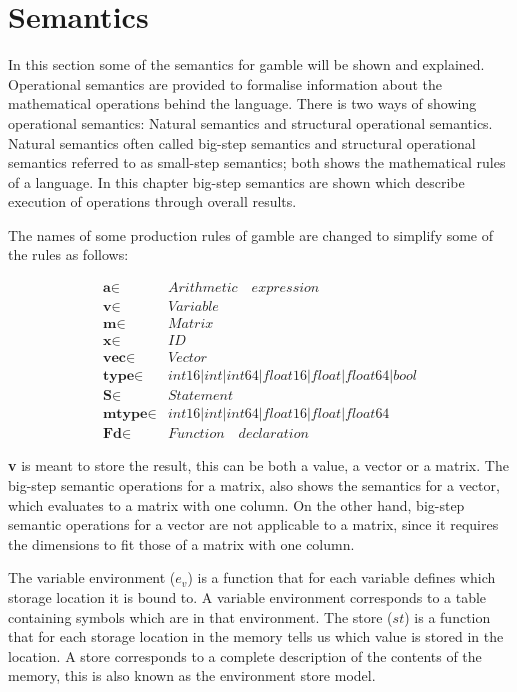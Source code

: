 \chapter{Semantics}
In this section some of the semantics for \gls{gamble} will be shown and explained.
Operational semantics are provided to formalise information about the mathematical operations behind the language.
There is two ways of showing operational semantics: Natural semantics and structural operational semantics.
Natural semantics often called big-step semantics and structural operational semantics referred to as small-step semantics; both shows the mathematical rules of a language. 
In this chapter big-step semantics are shown which describe execution of operations through overall results.

The names of some production rules of \gls{gamble} are changed to simplify some of the rules as follows:

\begin{align*}
	\textbf{a} \in  &Arithmetic\quad expression\\
	\textbf{v} \in  &Variable\\
	\textbf{m} \in  &Matrix\\
	\textbf{x} \in &ID\\
	\textbf{vec} \in  &Vector\\
	\textbf{type} \in &int16 | int | int64 | float16 | float | float64 | bool\\
	\textbf{S}	\in &Statement\\
	\textbf{mtype} \in &int16 | int | int64 | float16 | float | float64\\
	\textbf{Fd}		\in &Function\quad  declaration
\end{align*}

\textbf{v} is meant to store the result, this can be both a value, a vector or a matrix.
The big-step semantic operations for a matrix, also shows the semantics for a vector, which evaluates to a matrix with one column.
On the other hand, big-step semantic operations for a vector are not applicable to a matrix, since it requires the dimensions to fit those of a matrix with one column.

The variable environment (${ e }_{ v }$) is a function that for each variable defines which storage location it is bound to. A variable environment corresponds to a table containing symbols which are in that environment.
The store ($st$) is a function that for each storage location in the memory tells us which value is stored in the location. A store corresponds to a complete description of the contents of the memory, this is also known as the environment store model. \citep{EnvSt_Semantics}

